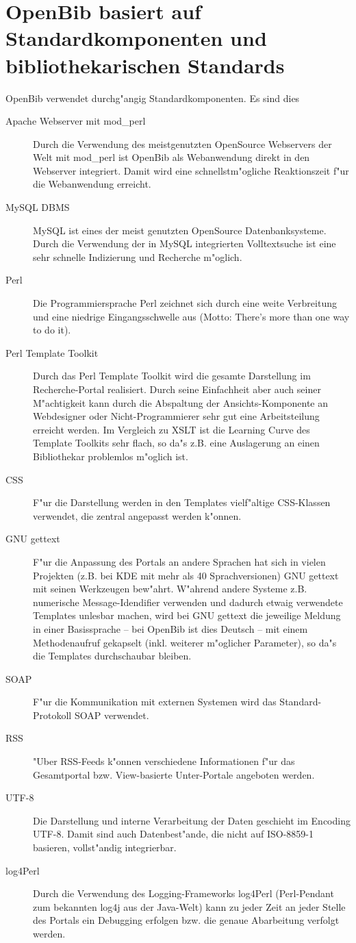 \documentclass[11pt, twoside, a4paper, BCOR8mm, DIV12, bibtotoc,idxtotoc]{scrbook}
\begin{document}
\section{OpenBib basiert auf Standardkomponenten und bibliothekarischen Standards}
OpenBib verwendet durchg"angig Standardkomponenten. Es sind dies
\begin{description}
\item[Apache Webserver mit mod\_perl] Durch die Verwendung des
  meistgenutzten OpenSource Web\-servers der Welt mit mod\_perl ist OpenBib als
  Webanwendung direkt in den Web\-server integriert. Damit wird eine
  schnellstm"ogliche Reaktionszeit f"ur die Webanwendung erreicht.
\item[MySQL DBMS] MySQL ist eines der meist genutzten OpenSource
  Datenbanksysteme. Durch die Verwendung der in MySQL integrierten
  Volltextsuche ist eine sehr schnelle Indizierung und Recherche m"oglich.
\item[Perl] Die Programmiersprache Perl zeichnet sich durch eine weite
  Verbreitung und eine niedrige Eingangsschwelle aus (Motto: There's
  more than one way to do it).
\item[Perl Template Toolkit] Durch das Perl Template Toolkit wird die
  gesamte Darstellung im Re\-cher\-che-Portal realisiert. Durch seine
  Einfachheit aber auch seiner M"achtigkeit kann durch die Abspaltung
  der Ansichts-Komponente an Webdesigner oder Nicht-Programmierer sehr
  gut eine Arbeitsteilung erreicht werden. Im Vergleich zu XSLT ist
  die Learning Curve des Template Toolkits sehr flach, so da"s
  z.B. eine Auslagerung an einen Bibliothekar problemlos m"oglich ist.
\item[CSS] F"ur die Darstellung werden in den Templates vielf"altige
  CSS-Klassen verwendet, die zentral angepasst werden k"onnen.
\item[GNU gettext] F"ur die Anpassung des Portals an andere Sprachen
  hat sich in vielen Projekten (z.B. bei KDE mit mehr als 40
  Sprachversionen) GNU gettext mit seinen Werkzeugen
  bew"ahrt. W"ahrend andere Systeme z.B. numerische Message-Idendifier
  verwenden und dadurch etwaig verwendete Templates unlesbar machen,
  wird bei GNU gettext die jeweilige Meldung in einer Basissprache
  -- bei OpenBib ist dies Deutsch -- mit einem Methodenaufruf
  gekapselt (inkl. weiterer m"oglicher Parameter), so da"s die
  Templates durchschaubar bleiben.
\item[SOAP] F"ur die Kommunikation mit externen Systemen wird das
  Standard-Protokoll SOAP verwendet.
\item[RSS] "Uber RSS-Feeds k"onnen verschiedene Informationen f"ur das
  Gesamtportal bzw. View-basierte Unter-Portale angeboten werden.
\item[UTF-8] Die Darstellung und interne Verarbeitung der Daten
  geschieht im Encoding UTF-8. Damit sind auch Datenbest"ande, die
  nicht auf ISO-8859-1 basieren, vollst"andig integrierbar.
\item[log4Perl] Durch die Verwendung des Logging-Frameworks log4Perl
  (Perl-Pendant zum bekannten log4j aus der Java-Welt) kann zu
  jeder Zeit an jeder Stelle des Portals ein Debugging erfolgen
  bzw. die genaue Abarbeitung verfolgt werden.
\end{description}
\end{document}
